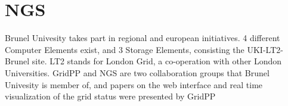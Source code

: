 \section{NGS}
Brunel Univesity takes part in regional and european initiatives. 4 different
Computer Elements exist, and 3 Storage Elements, consisting the UKI-LT2-Brunel
site. LT2 stands for London Grid, a co-operation with other London Universities.
GridPP and NGS are two collaboration groups that Brunel Univesity is member of,
and papers on the web interface \cite{Hobson2007} and real time visualization of
the grid status were presented \cite{Huang2007} by GridPP